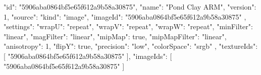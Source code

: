 {
  "id": "5906aba0864bf5e65f612a9b58a30875",
  "name": "Pond Clay ARM",
  "version": 1,
  "source": {
    "kind": "image",
    "imageId": "5906aba0864bf5e65f612a9b58a30875"
  },
  "settings": {
    "wrapU": "repeat",
    "wrapV": "repeat",
    "wrapW": "repeat",
    "minFilter": "linear",
    "magFilter": "linear",
    "mipMap": true,
    "mipMapFilter": "linear",
    "anisotropy": 1,
    "flipY": true,
    "precision": "low",
    "colorSpace": "srgb"
  },
  "textureIds": [
    "5906aba0864bf5e65f612a9b58a30875"
  ],
  "imageIds": [
    "5906aba0864bf5e65f612a9b58a30875"
  ]
}
